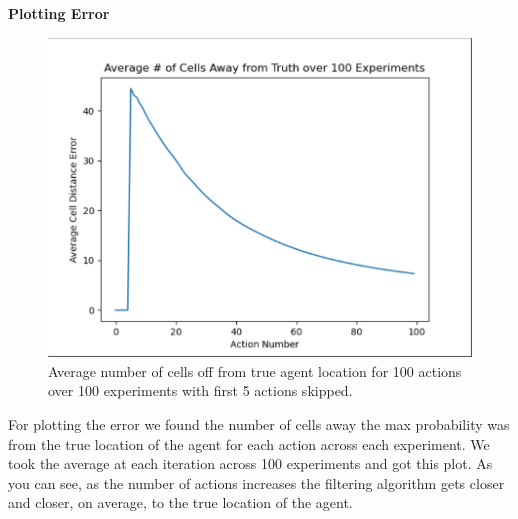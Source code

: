 \documentclass{article}
\begin{document}
        \clearpage
        \textbf{Plotting Error}\\
        \begin{figure}[H]
            \centering
            \includegraphics[width=\linewidth]{images/filter_err.png}
            \caption{Average number of cells off from true agent location for 100 actions 
                over 100 experiments with first 5 actions skipped.}
            \label{fig:filter_err}
            \small
        \end{figure}
        For plotting the error we found the number of cells away the max probability was from the true location
        of the agent for each action across each experiment. We took the average at each iteration across 100 
        experiments and got this plot. As you can see, as the number of actions increases the filtering algorithm
        gets closer and closer, on average, to the true location of the agent. 
        
\end{document}
